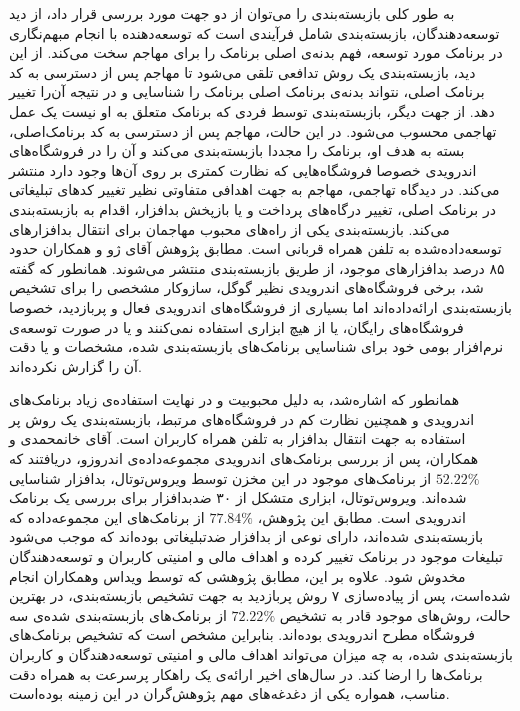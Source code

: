 به طور کلی بازبسته‌بندی را می‌توان از دو جهت مورد بررسی قرار داد، از دید توسعه‌دهندگان، بازبسته‌بندی شامل فرآیندی است که توسعه‌دهنده با انجام مبهم‌نگاری در برنامک مورد توسعه، فهم بدنه‌ی اصلی برنامک را برای مهاجم سخت می‌کند. از این دید، بازبسته‌بندی یک روش تدافعی تلقی می‌شود تا مهاجم پس از دسترسی به کد برنامک اصلی، نتواند بدنه‌ی برنامک اصلی برنامک را شناسایی و در نتیجه آن‌را تغییر دهد. از جهت دیگر، بازبسته‌بندی توسط فردی که برنامک متعلق به او نیست یک عمل تهاجمی محسوب می‌شود. در این حالت، مهاجم پس از دسترسی به کد برنامک‌اصلی، بسته به هدف او، برنامک‌ را مجددا بازبسته‌بندی می‌کند و آن را در فروشگاه‌های اندرویدی خصوصا فروشگاه‌هایی که نظارت کمتری بر روی آن‌ها وجود دارد منتشر می‌کند. در دیدگاه تهاجمی، مهاجم به جهت اهدافی متفاوتی نظیر تغییر کد‌های تبلیغاتی در برنامک اصلی، تغییر درگاه‌های پرداخت و یا بازپخش بدافزار، اقدام به بازبسته‌بندی می‌کند.
 بازبسته‌بندی یکی از راه‌های محبوب مهاجمان برای انتقال بدافزار‌های توسعه‌داده‌شده به تلفن‌ همراه قربانی‌ است. مطابق پژوهش آقای ژو و همکاران حدود ۸۵ درصد بدافزار‌های موجود، از طریق بازبسته‌بندی منتشر می‌شوند. همانطور که گفته شد، برخی فروشگاه‌های اندرویدی نظیر گوگل، سازوکار مشخصی را برای تشخیص بازبسته‌بندی ارائه‌داده‌اند اما بسیاری از فروشگاه‌های اندرویدی فعال و پربازدید، خصوصا فروشگاه‌های رایگان، یا از هیچ ابزاری استفاده نمی‌کنند و یا در صورت توسعه‌ی نرم‌افزار بومی خود برای شناسایی برنامک‌های بازبسته‌بندی شده، مشخصات و یا دقت آن را گزارش نکرده‌اند.
 
 همانطور که اشاره‌شد، به دلیل محبوبیت و در نهایت استفاده‌ی زیاد برنامک‌های اندرویدی و همچنین نظارت کم در فروشگاه‌های مرتبط، بازبسته‌بندی یک روش پر استفاده به جهت انتقال بدافزار‌ به تلفن همراه کاربران است. آقای خانمحمدی و همکاران، پس از بررسی  برنامک‌های اندرویدی مجموعه‌داده‌ی اندروزو، دریافتند که
 $52.22\%$
 از برنامک‌های موجود در این مخزن توسط ویروس‌توتال، بدافزار شناسایی شده‌اند. ویروس‌توتال، ابزاری متشکل از ۳۰ ضد‌بدافزار برای بررسی یک برنامک اندرویدی است. مطابق این پژوهش،
 $77.84\%$
 از برنامک‌های این مجموعه‌داده که بازبسته‌بندی شده‌اند، دارای نوعی از بدافزار ضدتبلیغاتی بوده‌اند که موجب می‌شود تبلیغات موجود در برنامک تغییر کرده و اهداف مالی و امنیتی کاربران و توسعه‌دهندگان مخدوش شود. علاوه بر این، مطابق پژوهشی که توسط ویداس وهمکاران انجام شده‌است، پس از پیاده‌سازی ۷ روش پربازدید به جهت تشخیص بازبسته‌بندی، در بهترین حالت‌، روش‌های موجود قادر به تشخیص
 $72.22\%$
 از برنامک‌های بازبسته‌بندی شده‌ی سه فروشگاه مطرح اندرویدی بوده‌اند. بنابراین مشخص است که تشخیص برنامک‌های بازبسته‌بندی شده، به چه میزان می‌تواند اهداف مالی و امنیتی توسعه‌دهندگان و کاربران برنامک‌ها را ارضا کند. در سال‌های اخیر ارائه‌ی یک راهکار پرسرعت به همراه دقت مناسب، همواره یکی از دغدغه‌های مهم پژوهش‌گران در این زمینه‌ بوده‌است.
 
